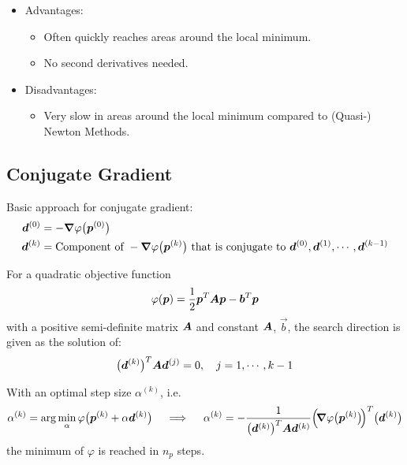 			\begin{itemize}
				\item Advantages:
					\begin{itemize}
						\item Often quickly reaches areas around the local minimum.
						\item No second derivatives needed.
					\end{itemize}
				\item Disadvantages:
					\begin{itemize}
						\item Very slow in areas around the local minimum compared to (Quasi-) Newton Methods.
					\end{itemize}
			\end{itemize}

		\subsection{Conjugate Gradient}
			Basic approach for conjugate gradient:
			\begin{align*}
				\bm{d}^{(0)} &= -\grad{\varphi}\big(\bm{p}^{(0)}\big) \\
				\bm{d}^{(k)} &= \text{Component of } -\grad{\varphi}\big(\bm{p}^{(k)}\big) \text{ that is conjugate to } \bm{d}^{(0)}, \bm{d}^{(1)}, \cdots, \bm{d}^{(k - 1)}
			\end{align*}

			For a quadratic objective function
			\begin{align*}
				\varphi(\bm{p}) = \frac{1}{2} \bm{p}^T \bm{A} \bm{p} - \bm{b}^T \bm{p}
			\end{align*}
			with a positive semi-definite matrix \(\bm{A}\) and constant \(\bm{A}\), \(\vec{b}\), the search direction is given as the solution of:
			\begin{align*}
				\big(\bm{d}^{(k)}\big)^T \bm{A} \bm{d}^{(j)} = 0,\quad j = 1, \cdots, k - 1
			\end{align*}

			With an optimal step size \( \alpha^{(k)} \), i.e.
			\begin{align*}
				\alpha^{(k)} = \arg\min_{\alpha} \varphi\big( \bm{p}^{(k)} + \alpha \bm{d}^{(k)} \big)
					\quad\implies\quad \alpha^{(k)} = -\frac{1}{\big(\bm{d}^{(k)}\big)^T \bm{A} \bm{d}^{(k)}} \Big(\! \grad{\varphi}\big(\bm{p}^{(k)}\big) \!\Big)^T \big(\bm{d}^{(k)}\big)
			\end{align*}
			the minimum of \(\varphi\) is reached in \(n_p\) steps.

